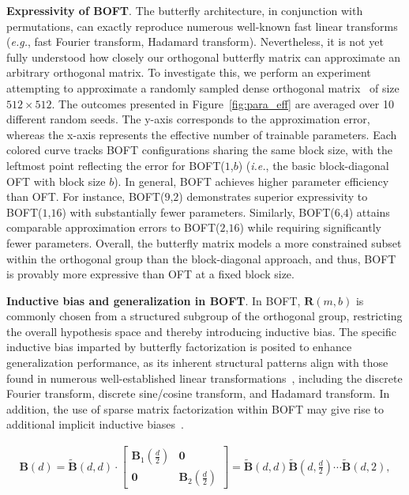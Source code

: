 \textbf{Expressivity of BOFT}. The butterfly architecture, in conjunction with permutations, can exactly reproduce numerous well-known fast linear transforms~\cite{dao2019learning,dao2019kaleidoscope} (\emph{e.g.}, fast Fourier transform, Hadamard transform). Nevertheless, it is not yet fully understood how closely our orthogonal butterfly matrix can approximate an arbitrary orthogonal matrix. To investigate this, we perform an experiment attempting to approximate a randomly sampled dense orthogonal matrix~\cite{anderson1987generation} of size $512\times 512$. The outcomes presented in Figure~\ref{fig:para_eff} are averaged over 10 different random seeds. The y-axis corresponds to the approximation error, whereas the x-axis represents the effective number of trainable parameters. Each colored curve tracks BOFT configurations sharing the same block size, with the leftmost point reflecting the error for BOFT($1$,$b$) (\emph{i.e.}, the basic block-diagonal OFT with block size $b$). In general, BOFT achieves higher parameter efficiency than OFT. For instance, BOFT($9$,$2$) demonstrates superior expressivity to BOFT($1$,$16$) with substantially fewer parameters. Similarly, BOFT($6$,$4$) attains comparable approximation errors to BOFT($2$,$16$) while requiring significantly fewer parameters. Overall, the butterfly matrix models a more constrained subset within the orthogonal group than the block-diagonal approach, and thus, BOFT is provably more expressive than OFT at a fixed block size.

\textbf{Inductive bias and generalization in BOFT}. In BOFT, $\bm{R}(m,b)$ is commonly chosen from a structured subgroup of the orthogonal group, restricting the overall hypothesis space and thereby introducing inductive bias. The specific inductive bias imparted by butterfly factorization is posited to enhance generalization performance, as its inherent structural patterns align with those found in numerous well-established linear transformations~\cite{dao2019kaleidoscope}, including the discrete Fourier transform, discrete sine/cosine transform, and Hadamard transform. In addition, the use of sparse matrix factorization within BOFT may give rise to additional implicit inductive biases~\cite{gunasekar2017implicit,li2018algorithmic,liu2019neural}.

\begin{equation}
\begin{aligned}
    \!\!\bm{B}(d)=\tilde{\bm{B}}(d,d)\!\cdot\!\begin{bmatrix}
    \bm{B}_1(\frac{d}{2})\!\!\!\!\! & \bm{0} \\
    \bm{0}\!\!\!\!\! &\bm{B}_2(\frac{d}{2})
    \end{bmatrix}= \tilde{\bm{B}}(d,d)\tilde{\bm{B}}(d,\frac{d}{2})\cdots\tilde{\bm{B}}(d,2),
\end{aligned}
\end{equation}

